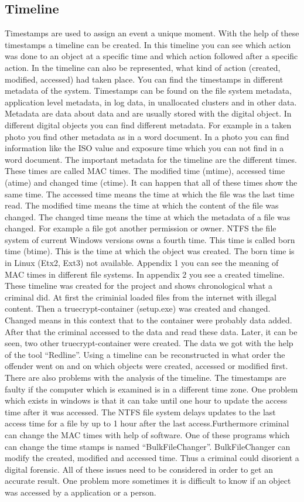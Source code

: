 \subsection{Timeline}
Timestamps are used to assign an event a unique moment. With the help of these timestamps a timeline can be created. In this timeline you can see which action was done to an object at a specific time and which action followed after a specific action. In the timeline can also be represented, what kind of action (created, modified, accessed) had taken place. You can find the timestamps in different metadata of the system. Timestamps can be found on the file system metadata, application level metadata, in log data, in unallocated clusters and in other data. Metadata are data about data and are usually stored with the digital object. In different digital objects you can find different metadata. For example in a taken photo you find other metadata as in a word document. In a photo you can find information like the ISO value and exposure time which you can not find in a word document. The important metadata for the timeline are the different times. These times are called MAC times. The modified time (mtime), accessed time (atime) and changed time (ctime). It can happen that all of these times show the same time. The accessed time means the time at which the file was the last time read. The modified time means the time at which the content of the file was changed. The changed time means the time at which the metadata of a file was changed. For example a file got another permission or owner. NTFS the file system of current Windows versions owns a fourth time. This time is called born time (btime). This is the time at which the object was created. The born time is in Linux (Etx2, Ext3) not available. Appendix 1 you can see the meaning of MAC times in different file systems. In appendix 2 you see a created timeline. These timeline was created for the project and shows chronological what a criminal did. At first the criminial loaded files from the internet with illegal content. Then a truecrypt-container (setup.exe) was created and changed. Changed means in this context that to the container were probably data added. After that the criminal accessed to the data and read these data. Later, it can be seen, two other truecrypt-container were created. The data we got with the help of the tool “Redline”. Using a timeline can be reconstructed in what order the offender went on and on which objects were created, accessed or modified first. 
There are also problems with the analysis of the timeline. The timestamps are faulty if the computer which is examined is in a different time zone. One problem which exists in windows is that it can take until one hour to update the access time after it was accessed. The NTFS file system delays updates to the last access time for a file by up to 1 hour after the last access.Furthermore criminal can change the MAC times with help of software. One of these programs which can change the time stamps is named “BulkFileChanger”. BulkFileChanger can modify the created, modified and accessed time. Thus a criminal could disorient a digital forensic. All of these issues need to be considered in order to get an accurate result. One problem more sometimes it is difficult to know if an object was accessed by a application or a person. 
